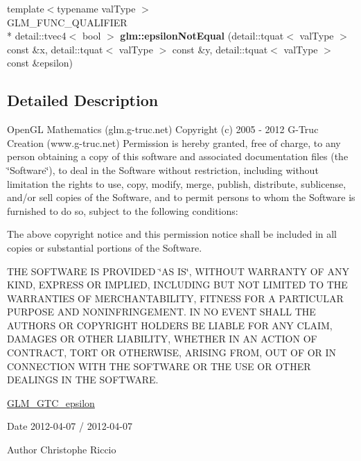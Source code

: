 \begin{DoxyCompactItemize}
\item 
\hypertarget{namespaceglm_ac4c812023f109590f2f2dabb934266d9}{{\footnotesize template$<$typename val\-Type $>$ }\\G\-L\-M\-\_\-\-F\-U\-N\-C\-\_\-\-Q\-U\-A\-L\-I\-F\-I\-E\-R \\*
detail\-::tvec4$<$ bool $>$ {\bfseries glm\-::epsilon\-Not\-Equal} (detail\-::tquat$<$ val\-Type $>$ const \&x, detail\-::tquat$<$ val\-Type $>$ const \&y, detail\-::tquat$<$ val\-Type $>$ const \&epsilon)}\label{namespaceglm_ac4c812023f109590f2f2dabb934266d9}

\end{DoxyCompactItemize}


\subsection{Detailed Description}
Open\-G\-L Mathematics (glm.\-g-\/truc.\-net) Copyright (c) 2005 -\/ 2012 G-\/\-Truc Creation (www.\-g-\/truc.\-net) Permission is hereby granted, free of charge, to any person obtaining a copy of this software and associated documentation files (the \char`\"{}\-Software\char`\"{}), to deal in the Software without restriction, including without limitation the rights to use, copy, modify, merge, publish, distribute, sublicense, and/or sell copies of the Software, and to permit persons to whom the Software is furnished to do so, subject to the following conditions\-:

The above copyright notice and this permission notice shall be included in all copies or substantial portions of the Software.

T\-H\-E S\-O\-F\-T\-W\-A\-R\-E I\-S P\-R\-O\-V\-I\-D\-E\-D \char`\"{}\-A\-S I\-S\char`\"{}, W\-I\-T\-H\-O\-U\-T W\-A\-R\-R\-A\-N\-T\-Y O\-F A\-N\-Y K\-I\-N\-D, E\-X\-P\-R\-E\-S\-S O\-R I\-M\-P\-L\-I\-E\-D, I\-N\-C\-L\-U\-D\-I\-N\-G B\-U\-T N\-O\-T L\-I\-M\-I\-T\-E\-D T\-O T\-H\-E W\-A\-R\-R\-A\-N\-T\-I\-E\-S O\-F M\-E\-R\-C\-H\-A\-N\-T\-A\-B\-I\-L\-I\-T\-Y, F\-I\-T\-N\-E\-S\-S F\-O\-R A P\-A\-R\-T\-I\-C\-U\-L\-A\-R P\-U\-R\-P\-O\-S\-E A\-N\-D N\-O\-N\-I\-N\-F\-R\-I\-N\-G\-E\-M\-E\-N\-T. I\-N N\-O E\-V\-E\-N\-T S\-H\-A\-L\-L T\-H\-E A\-U\-T\-H\-O\-R\-S O\-R C\-O\-P\-Y\-R\-I\-G\-H\-T H\-O\-L\-D\-E\-R\-S B\-E L\-I\-A\-B\-L\-E F\-O\-R A\-N\-Y C\-L\-A\-I\-M, D\-A\-M\-A\-G\-E\-S O\-R O\-T\-H\-E\-R L\-I\-A\-B\-I\-L\-I\-T\-Y, W\-H\-E\-T\-H\-E\-R I\-N A\-N A\-C\-T\-I\-O\-N O\-F C\-O\-N\-T\-R\-A\-C\-T, T\-O\-R\-T O\-R O\-T\-H\-E\-R\-W\-I\-S\-E, A\-R\-I\-S\-I\-N\-G F\-R\-O\-M, O\-U\-T O\-F O\-R I\-N C\-O\-N\-N\-E\-C\-T\-I\-O\-N W\-I\-T\-H T\-H\-E S\-O\-F\-T\-W\-A\-R\-E O\-R T\-H\-E U\-S\-E O\-R O\-T\-H\-E\-R D\-E\-A\-L\-I\-N\-G\-S I\-N T\-H\-E S\-O\-F\-T\-W\-A\-R\-E.

\hyperlink{group__gtc__epsilon}{G\-L\-M\-\_\-\-G\-T\-C\-\_\-epsilon}

\begin{DoxyDate}{Date}
2012-\/04-\/07 / 2012-\/04-\/07 
\end{DoxyDate}
\begin{DoxyAuthor}{Author}
Christophe Riccio 
\end{DoxyAuthor}
